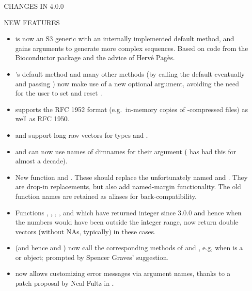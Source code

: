 \documentclass[letterpaper]{book}
\begin{document}
\begin{Section}{ CHANGES IN 4.0.0}
\begin{SubSection}{NEW FEATURES}
\begin{itemize}
\item{}  is now an S3 generic with an internally
implemented default method, and gains arguments to generate more
complex sequences.  Based on code from the 
Bioconductor package and the advice of Hervé Pagès.

\item{} 's default method and many other methods (by
calling the default eventually and passing ) now make
use of a new optional  argument, avoiding the need for
the user to set and reset .

\item{}  supports the RFC 1952 format
(e.g.~in-memory copies of -compressed files)
as well as RFC 1950.

\item{}  and  support long
raw vectors for types  and .

\item{}  and  can now use names
of dimnames for their  argument ( has
had this for almost a decade).

\item{} New function  and
. These should replace the unfortunately named
 and . They are drop-in
replacements, but also add named-margin functionality. The old
function names are retained as aliases for back-compatibility.

\item{} Functions , , ,
,   and
 which have returned integer since \R{} 3.0.0 and hence
 when the numbers would have been outside the integer range,
now return double vectors (without NAs, typically) in these cases.

\item{}  (and hence  and
) now call the corresponding methods of
 and , e.g, when  is a
 or  object; prompted by Spencer Graves'
suggestion.

\item{}  now allows customizing error messages via
argument names, thanks to a patch proposal by Neal Fultz in .


\end{itemize}
\end{SubSection}
\end{Section}
\end{document}
